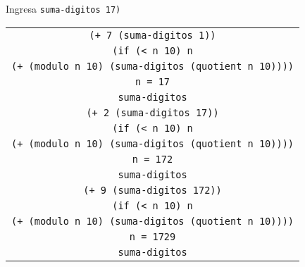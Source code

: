 \documentclass[letterpaper,11pt]{article}
\begin{document}
\begin{enumerate}
\begin{enumerate}
        \newpage
        Ingresa \texttt{suma-digitos 17)}
        \begin{center}
            \begin{tabular}[h]{|c|}
                \hline
                \texttt{(+ 7 (suma-digitos 1))} \\
                \texttt{(if (< n 10) n} \\
                \texttt{(+ (modulo n 10) (suma-digitos (quotient n 10))))} \\ 
                \texttt{n = 17} \\
                \texttt{suma-digitos} \\
                \hline
                \hline
                \texttt{(+ 2 (suma-digitos 17))} \\
                \texttt{(if (< n 10) n} \\
                \texttt{(+ (modulo n 10) (suma-digitos (quotient n 10))))} \\ 
                \texttt{n = 172} \\
                \texttt{suma-digitos} \\
                \hline
                \hline
                \texttt{(+ 9 (suma-digitos 172))} \\
                \texttt{(if (< n 10) n} \\
                \texttt{(+ (modulo n 10) (suma-digitos (quotient n 10))))} \\ 
                \texttt{n = 1729} \\
                \texttt{suma-digitos} \\
                \hline
            \end{tabular}
        \end{center}


\end{enumerate}
\end{enumerate}
\end{document}
